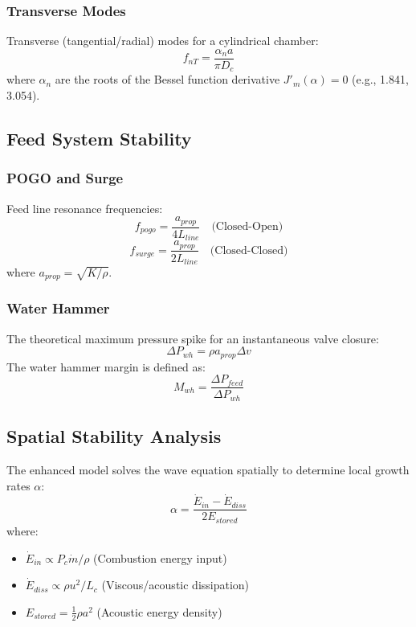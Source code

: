 \subsubsection{Transverse Modes}
Transverse (tangential/radial) modes for a cylindrical chamber:
\begin{equation}
f_{nT} = \frac{\alpha_n a}{\pi D_c}
\end{equation}
where $\alpha_n$ are the roots of the Bessel function derivative $J'_m(\alpha) = 0$ (e.g., 1.841, 3.054).

\subsection{Feed System Stability}

\subsubsection{POGO and Surge}
Feed line resonance frequencies:
\begin{equation}
f_{pogo} = \frac{a_{prop}}{4 L_{line}} \quad \text{(Closed-Open)}
\end{equation}
\begin{equation}
f_{surge} = \frac{a_{prop}}{2 L_{line}} \quad \text{(Closed-Closed)}
\end{equation}
where $a_{prop} = \sqrt{K/\rho}$.

\subsubsection{Water Hammer}
The theoretical maximum pressure spike for an instantaneous valve closure:
\begin{equation}
\Delta P_{wh} = \rho a_{prop} \Delta v
\end{equation}
The water hammer margin is defined as:
\begin{equation}
M_{wh} = \frac{\Delta P_{feed}}{\Delta P_{wh}}
\end{equation}

\subsection{Spatial Stability Analysis}
The enhanced model solves the wave equation spatially to determine local growth rates $\alpha$:
\begin{equation}
\alpha = \frac{\dot{E}_{in} - \dot{E}_{diss}}{2 E_{stored}}
\end{equation}
where:
\begin{itemize}
    \item $\dot{E}_{in} \propto P_c \dot{m} / \rho$ (Combustion energy input)
    \item $\dot{E}_{diss} \propto \rho u^2 / L_c$ (Viscous/acoustic dissipation)
    \item $E_{stored} = \frac{1}{2} \rho a^2$ (Acoustic energy density)
\end{itemize}

